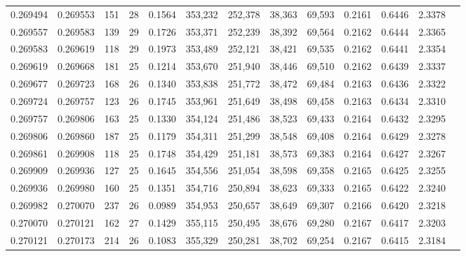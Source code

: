 \begin{tabular}{rrrrrrrrrrrrr}
0.269494 & 0.269553 &   151 &  28 &                                     0.1564 & 353,232 & 252,378 &  38,363 &  69,593 & 0.2161 & 0.6446 & 2.3378 \\
0.269557 & 0.269583 &   139 &  29 &                                     0.1726 & 353,371 & 252,239 &  38,392 &  69,564 & 0.2162 & 0.6444 & 2.3365 \\
0.269583 & 0.269619 &   118 &  29 &                                     0.1973 & 353,489 & 252,121 &  38,421 &  69,535 & 0.2162 & 0.6441 & 2.3354 \\
0.269619 & 0.269668 &   181 &  25 &                                     0.1214 & 353,670 & 251,940 &  38,446 &  69,510 & 0.2162 & 0.6439 & 2.3337 \\
0.269677 & 0.269723 &   168 &  26 &                                     0.1340 & 353,838 & 251,772 &  38,472 &  69,484 & 0.2163 & 0.6436 & 2.3322 \\
0.269724 & 0.269757 &   123 &  26 &                                     0.1745 & 353,961 & 251,649 &  38,498 &  69,458 & 0.2163 & 0.6434 & 2.3310 \\
0.269757 & 0.269806 &   163 &  25 &                                     0.1330 & 354,124 & 251,486 &  38,523 &  69,433 & 0.2164 & 0.6432 & 2.3295 \\
0.269806 & 0.269860 &   187 &  25 &                                     0.1179 & 354,311 & 251,299 &  38,548 &  69,408 & 0.2164 & 0.6429 & 2.3278 \\
0.269861 & 0.269908 &   118 &  25 &                                     0.1748 & 354,429 & 251,181 &  38,573 &  69,383 & 0.2164 & 0.6427 & 2.3267 \\
0.269909 & 0.269936 &   127 &  25 &                                     0.1645 & 354,556 & 251,054 &  38,598 &  69,358 & 0.2165 & 0.6425 & 2.3255 \\
0.269936 & 0.269980 &   160 &  25 &                                     0.1351 & 354,716 & 250,894 &  38,623 &  69,333 & 0.2165 & 0.6422 & 2.3240 \\
0.269982 & 0.270070 &   237 &  26 &                                     0.0989 & 354,953 & 250,657 &  38,649 &  69,307 & 0.2166 & 0.6420 & 2.3218 \\
0.270070 & 0.270121 &   162 &  27 &                                     0.1429 & 355,115 & 250,495 &  38,676 &  69,280 & 0.2167 & 0.6417 & 2.3203 \\
0.270121 & 0.270173 &   214 &  26 &                                     0.1083 & 355,329 & 250,281 &  38,702 &  69,254 & 0.2167 & 0.6415 & 2.3184 \\

\end{tabular}
